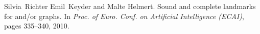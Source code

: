 \begin{thebibliography}{10}
\footnotesize

Silvia~Richter Emil~Keyder and Malte Helmert.
\newblock Sound and complete landmarks for and/or graphs.
\newblock In {\em Proc. of Euro. Conf. on Artificial Intelligence ({ECAI})},
pages 335--340, 2010.
\end{thebibliography}
